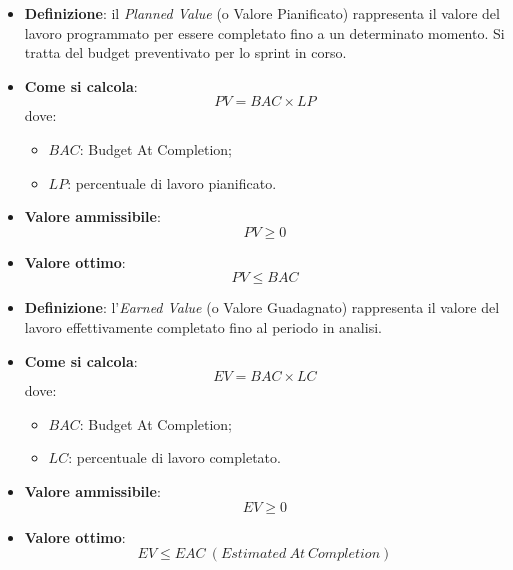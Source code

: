 \begin{itemize}
	\item \textbf{Definizione}: il \textit{Planned Value} (o Valore Pianificato) rappresenta il valore del lavoro programmato per essere completato fino a un determinato momento. Si tratta del budget preventivato per lo sprint in corso.
	\item \textbf{Come si calcola}: \begin{equation*}PV = BAC \times LP\end{equation*} dove:
		\begin{itemize}
			\item $BAC$: Budget At Completion;
			\item $LP$: percentuale di lavoro pianificato.
		\end{itemize}
	\item \textbf{Valore ammissibile}: \begin{equation*}PV \geq 0\end{equation*}
	\item \textbf{Valore ottimo}: \begin{equation*}PV \leq BAC\end{equation*}
\end{itemize}

\begin{itemize}
	\item \textbf{Definizione}: l'\textit{Earned Value} (o Valore Guadagnato) rappresenta il valore del lavoro effettivamente completato fino al periodo in analisi.
	\item \textbf{Come si calcola}: \begin{equation*}EV = BAC \times LC\end{equation*} dove:
		\begin{itemize}
			\item $BAC$: Budget At Completion;
			\item $LC$: percentuale di lavoro completato.
		\end{itemize}
	\item \textbf{Valore ammissibile}: \begin{equation*}EV \geq 0\end{equation*}
	\item \textbf{Valore ottimo}: \begin{equation*}EV \leq EAC\ (Estimated\ At\ Completion)\end{equation*}
\end{itemize}

